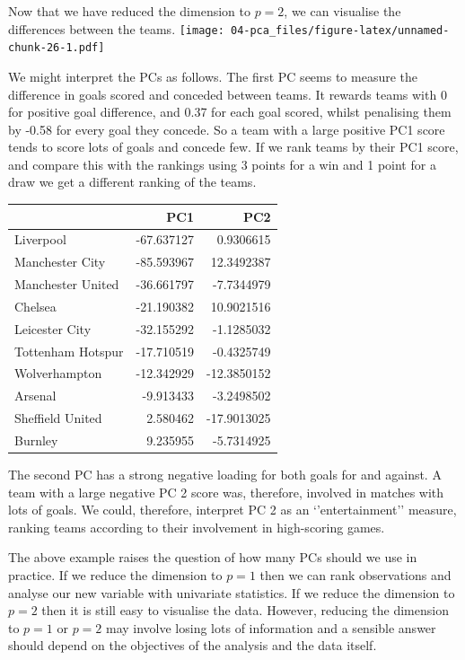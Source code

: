 \documentclass[]{book}
\theoremstyle{definition}
\theoremstyle{definition}
\theoremstyle{definition}
\theoremstyle{remark}
\begin{document}
Now that we have reduced the dimension to \(p=2\), we can visualise the differences between the teams.
\texttt{[image: 04-pca\_files/figure-latex/unnamed-chunk-26-1.pdf]}

We might interpret the PCs as follows. The first PC seems to measure the difference in goals scored and conceded between teams. It rewards teams with 0 for positive goal difference, and 0.37 for each goal scored, whilst penalising them by -0.58 for every goal they concede. So a team with a large positive PC1 score tends to score lots of goals and concede few. If we rank teams by their PC1 score, and compare this with the rankings using 3 points for a win and 1 point for a draw we get a different ranking of the teams.

\begin{tabular}{lrr}
\toprule
  & PC1 & PC2\\
\midrule
Liverpool & -67.637127 & 0.9306615\\
Manchester City & -85.593967 & 12.3492387\\
Manchester United & -36.661797 & -7.7344979\\
Chelsea & -21.190382 & 10.9021516\\
Leicester City & -32.155292 & -1.1285032\\
\addlinespace
Tottenham Hotspur & -17.710519 & -0.4325749\\
Wolverhampton & -12.342929 & -12.3850152\\
Arsenal & -9.913433 & -3.2498502\\
Sheffield United & 2.580462 & -17.9013025\\
Burnley & 9.235955 & -5.7314925\\
\bottomrule
\end{tabular}

The second PC has a strong negative loading for both goals for and against. A team with a large negative PC 2 score was, therefore, involved in matches with lots of goals. We could, therefore, interpret PC 2 as an `'entertainment'' measure, ranking teams according to their involvement in high-scoring games.

The above example raises the question of how many PCs should we use in practice. If we reduce the dimension to \(p=1\) then we can rank observations and analyse our new variable with univariate statistics. If we reduce the dimension to \(p=2\) then it is still easy to visualise the data. However, reducing the dimension to \(p=1\) or \(p=2\) may involve losing lots of information and a sensible answer should depend on the objectives of the analysis and the data itself.
\end{document}
